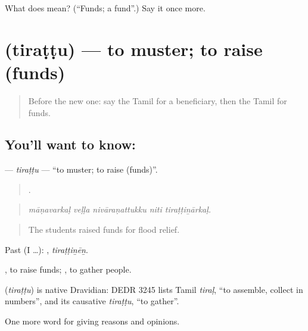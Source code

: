 \begin{tcolorbox}[breakable,colback=teal!4,colframe=teal!35!black,title={Before you move on}]
What does  mean? (\textquotedblleft{}Funds; a fund\textquotedblright{}.) Say it once more.
\end{tcolorbox}
\section[\texorpdfstring{\ta{திரட்டு} (tiraṭṭu)}{திரட்டு (tiraṭṭu)}]{ (tiraṭṭu) — to muster; to raise (funds)}

\label{lesson:TA-C379-tirattu}



\begin{quote}
Before the new one: say the Tamil for a beneficiary, then the Tamil for funds.
\end{quote}

\subsection*{You'll want to know: }
\textbf{} — \emph{tiraṭṭu} — \textquotedblleft{}to muster; to raise (funds)\textquotedblright{}.

\begin{quote}
    .
\end{quote}

\begin{quote}
\emph{māṇavarkaḷ veḷḷa nivāraṇattukku niti tiraṭṭiṉārkaḷ.}
\end{quote}

\begin{quote}
The students raised funds for flood relief.
\end{quote}

Past (I …): , \emph{tiraṭṭiṉēṉ}.

 , to raise funds;  , to gather people.

\begin{cousinweb}
\textbf{} (\emph{tiraṭṭu}) is native Dravidian: DEDR 3245 lists Tamil \emph{tiraḷ}, \textquotedblleft{}to assemble, collect in numbers\textquotedblright{}, and its causative \emph{tiraṭṭu}, \textquotedblleft{}to gather\textquotedblright{}.
\end{cousinweb}

\begin{grammarlens}[title={What you've built}]
One more word for giving reasons and opinions.
\end{grammarlens}

